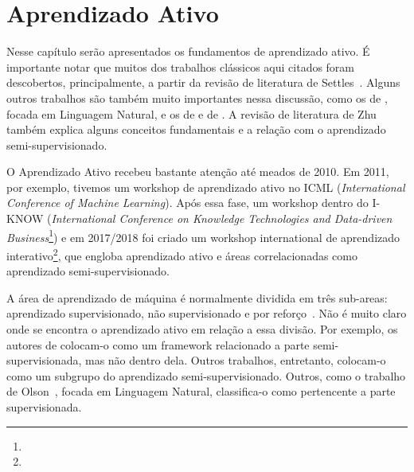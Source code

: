 \chapter{Aprendizado Ativo}
\label{cap:aprendizado_ativo}

Nesse capítulo serão apresentados os fundamentos de aprendizado ativo. É importante notar que muitos dos trabalhos clássicos aqui citados foram descobertos, principalmente, a partir da revisão de literatura de Settles~\citep{settles2012active,settles2014active}. Alguns outros trabalhos são também muito importantes nessa discussão, como os de \cite{olsson2009literature}, focada em Linguagem Natural, e os de \cite{aggarwal2014active} e de \cite{wang2011active}. A revisão de literatura de Zhu~\citep{zhu2006semi} também explica alguns conceitos fundamentais e a relação com o aprendizado semi-supervisionado.

O Aprendizado Ativo recebeu bastante atenção até meados de 2010. Em 2011, por exemplo, tivemos um workshop de aprendizado ativo no ICML (\emph{International Conference of Machine Learning}). Após essa fase,  um workshop dentro do I-KNOW (\emph{International Conference on Knowledge Technologies and Data-driven Business}\footnote{}) e em 2017/2018 foi criado um workshop international de aprendizado interativo\footnote{}, que engloba aprendizado ativo e áreas correlacionadas como aprendizado semi-supervisionado. 

A área de aprendizado de máquina é normalmente dividida em três sub-areas: aprendizado supervisionado, não supervisionado e por reforço~\citep{abu2012learning}. Não é muito claro onde se encontra o aprendizado ativo em relação a essa divisão. Por exemplo, os autores de \cite{settles2012active, zhu2006semi} colocam-o como um framework relacionado a parte semi-supervisionada, mas não dentro dela. Outros trabalhos, entretanto, colocam-o como um subgrupo do aprendizado semi-supervisionado. Outros, como o trabalho de Olson~\citep{olsson2009literature}, focada em Linguagem Natural, classifica-o como pertencente a parte supervisionada. 


